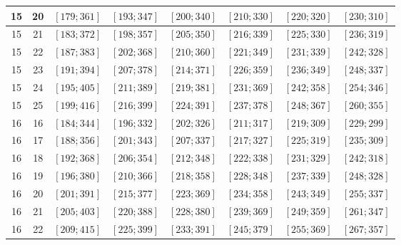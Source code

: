 \documentclass[a4paper,12pt]{article}
\begin{document}
\begin{center}
{\begin{longtable}[H]{|c|c|c|c|c|c|c|c|}
15 &  20 &  $\left[ 179; 361\right]$ &  $\left[ 193; 347\right]$ &  $\left[ 200; 340\right]$ &  $\left[ 210; 330\right]$ &  $\left[ 220; 320\right]$ &  $\left[ 230; 310\right]$ \tabularnewline \hline
15 &  21 &  $\left[ 183; 372\right]$ &  $\left[ 198; 357\right]$ &  $\left[ 205; 350\right]$ &  $\left[ 216; 339\right]$ &  $\left[ 225; 330\right]$ &  $\left[ 236; 319\right]$ \tabularnewline \hline
15 &  22 &  $\left[ 187; 383\right]$ &  $\left[ 202; 368\right]$ &  $\left[ 210; 360\right]$ &  $\left[ 221; 349\right]$ &  $\left[ 231; 339\right]$ &  $\left[ 242; 328\right]$ \tabularnewline \hline
15 &  23 &  $\left[ 191; 394\right]$ &  $\left[ 207; 378\right]$ &  $\left[ 214; 371\right]$ &  $\left[ 226; 359\right]$ &  $\left[ 236; 349\right]$ &  $\left[ 248; 337\right]$ \tabularnewline \hline
15 &  24 &  $\left[ 195; 405\right]$ &  $\left[ 211; 389\right]$ &  $\left[ 219; 381\right]$ &  $\left[ 231; 369\right]$ &  $\left[ 242; 358\right]$ &  $\left[ 254; 346\right]$ \tabularnewline \hline
15 &  25 &  $\left[ 199; 416\right]$ &  $\left[ 216; 399\right]$ &  $\left[ 224; 391\right]$ &  $\left[ 237; 378\right]$ &  $\left[ 248; 367\right]$ &  $\left[ 260; 355\right]$ \tabularnewline \hline
16 &  16 &  $\left[ 184; 344\right]$ &  $\left[ 196; 332\right]$ &  $\left[ 202; 326\right]$ &  $\left[ 211; 317\right]$ &  $\left[ 219; 309\right]$ &  $\left[ 229; 299\right]$ \tabularnewline \hline
16 &  17 &  $\left[ 188; 356\right]$ &  $\left[ 201; 343\right]$ &  $\left[ 207; 337\right]$ &  $\left[ 217; 327\right]$ &  $\left[ 225; 319\right]$ &  $\left[ 235; 309\right]$ \tabularnewline \hline
16 &  18 &  $\left[ 192; 368\right]$ &  $\left[ 206; 354\right]$ &  $\left[ 212; 348\right]$ &  $\left[ 222; 338\right]$ &  $\left[ 231; 329\right]$ &  $\left[ 242; 318\right]$ \tabularnewline \hline
16 &  19 &  $\left[ 196; 380\right]$ &  $\left[ 210; 366\right]$ &  $\left[ 218; 358\right]$ &  $\left[ 228; 348\right]$ &  $\left[ 237; 339\right]$ &  $\left[ 248; 328\right]$ \tabularnewline \hline
16 &  20 &  $\left[ 201; 391\right]$ &  $\left[ 215; 377\right]$ &  $\left[ 223; 369\right]$ &  $\left[ 234; 358\right]$ &  $\left[ 243; 349\right]$ &  $\left[ 255; 337\right]$ \tabularnewline \hline
16 &  21 &  $\left[ 205; 403\right]$ &  $\left[ 220; 388\right]$ &  $\left[ 228; 380\right]$ &  $\left[ 239; 369\right]$ &  $\left[ 249; 359\right]$ &  $\left[ 261; 347\right]$ \tabularnewline \hline
16 &  22 &  $\left[ 209; 415\right]$ &  $\left[ 225; 399\right]$ &  $\left[ 233; 391\right]$ &  $\left[ 245; 379\right]$ &  $\left[ 255; 369\right]$ &  $\left[ 267; 357\right]$ \tabularnewline \hline

\end{longtable}}
\end{center}
\end{document}
